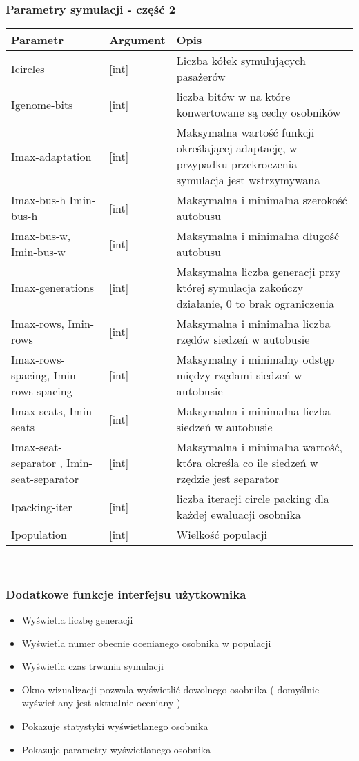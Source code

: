 \documentclass[bibtotocnumbered, headsepline,normalheadings,12pt,polish]{scrreprt}
\begin{document}
\subsubsection{Parametry symulacji - część 2}
\begin{tabular}{| p{2.5cm} | l || p{9cm} |}
\hline
Parametr & Argument & Opis \\
\hline
\hline
Icircles & [int] & Liczba kółek symulujących pasażerów\\
\hline
Igenome-bits & [int] & liczba bitów w na które konwertowane są cechy osobników\\
\hline
Imax-adaptation & [int] & Maksymalna wartość funkcji określającej adaptację, w przypadku przekroczenia symulacja jest wstrzymywana\\
\hline
Imax-bus-h Imin-bus-h & [int] & Maksymalna i minimalna szerokość autobusu\\
\hline
Imax-bus-w, Imin-bus-w & [int] & Maksymalna i minimalna długość autobusu\\
\hline
Imax-generations & [int] & Maksymalna liczba generacji przy której symulacja zakończy działanie, 0 to brak ograniczenia\\
\hline
Imax-rows, Imin-rows & [int] & Maksymalna i minimalna liczba rzędów siedzeń w autobusie\\
\hline
Imax-rows-spacing, Imin-rows-spacing& [int] & Maksymalny i minimalny odstęp między rzędami siedzeń w autobusie\\
\hline
Imax-seats, Imin-seats& [int] & Maksymalna i minimalna liczba siedzeń w autobusie\\
\hline
Imax-seat-separator , Imin-seat-separator & [int] & Maksymalna i minimalna wartość, która określa co ile siedzeń w rzędzie jest separator\\
\hline
Ipacking-iter & [int] & liczba iteracji circle packing dla każdej ewaluacji osobnika\\
\hline
Ipopulation & [int] & Wielkość populacji\\
\hline
\end{tabular}
\\
\subsubsection{Dodatkowe funkcje interfejsu użytkownika}
\begin{itemize}
    \item Wyświetla liczbę generacji
    \item Wyświetla numer obecnie ocenianego osobnika w populacji
    \item Wyświetla czas trwania symulacji
    \item Okno wizualizacji pozwala wyświetlić dowolnego osobnika ( domyślnie wyświetlany jest aktualnie oceniany )
    \item Pokazuje statystyki wyświetlanego osobnika
    \item Pokazuje parametry wyświetlanego osobnika
\end{itemize}
\end{document}
